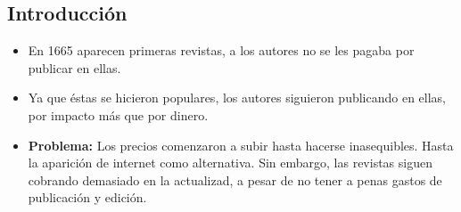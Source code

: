 \documentclass[a0,portrait]{a0poster}
\begin{document}
\begin{multicols}{2} %




  \color{Black} %
  \section*{Introducción}
  \begin{itemize}
  \item En 1665 aparecen primeras revistas, a los autores no se les pagaba por publicar en ellas.
  \item Ya que éstas se hicieron populares, los autores siguieron publicando en ellas, por impacto más que por dinero.
  \item \textbf{Problema:} Los precios comenzaron a subir hasta hacerse inasequibles. Hasta la aparición de internet como alternativa. Sin embargo, las revistas siguen cobrando demasiado en la actualizad, a pesar de no tener a penas gastos de publicación y edición.
  \end{itemize}


\end{multicols}
\end{document}
